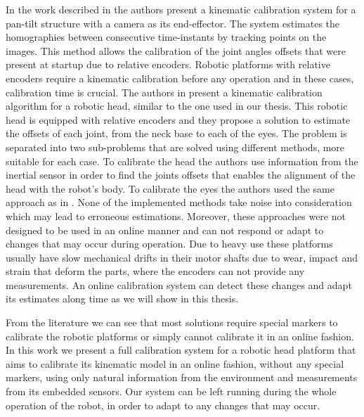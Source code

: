 In the work described in \cite{Tworek08} the authors present a kinematic calibration system for a pan-tilt structure with a camera as its end-effector. The system estimates the homographies between consecutive time-instants by tracking points on the images. This method allows the calibration of the joint angles offsets that were present at startup due to relative encoders. Robotic platforms with relative encoders require a kinematic calibration before any operation and in these cases, calibration time is crucial. The authors in \cite{Santos10} present a kinematic calibration algorithm for a robotic head, similar to the one used in our thesis. This robotic head is equipped with relative encoders and they propose a solution to estimate the offsets of each joint, from the neck base to each of the eyes. The problem is separated into two sub-problems that are solved using different methods, more suitable for each case. To calibrate the head the authors use information from the inertial sensor in order to find the joints offsets that enables the alignment of the head with the robot's body. To calibrate the eyes the authors used the same approach as in \cite{Tworek08}. None of the implemented methods take noise into consideration which may lead to erroneous estimations. Moreover, these approaches were not designed to be used in an online manner and can not respond or adapt to changes that may occur during operation. Due to heavy use these platforms usually have slow mechanical drifts in their motor shafts due to wear, impact and strain that deform the parts, where the encoders can not provide any measurements. An online calibration system can detect these changes and adapt its estimates along time as we will show in this thesis.

From the literature we can see that most solutions require special markers to calibrate the robotic platforms or simply cannot calibrate it in an online fashion. In this work we present a full calibration system for a robotic head platform that aims to calibrate its kinematic model in an online fashion, without any special markers, using only natural information from the environment and measurements from its embedded sensors. Our system can be left running during the whole operation of the robot, in order to adapt to any changes that may occur.

